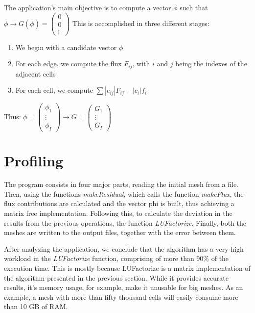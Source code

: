 \documentclass[a4paper,10pt,openright,openbib,twocolumn]{article}
\begin{document}
The application's main objective is to compute a vector $\overline{\phi}$ such that $\overline{\phi} \longrightarrow G(\overline{\phi}) = \left(\begin{array}{c}
0\\ 
0\\
\vdots\end{array}\right)$
This is accomplished in three different stages:
\begin{enumerate}
    \item {We begin with a candidate vector $\phi$} 
    \item {For each edge, we compute the flux $F_{ij}$, with $i$ and $j$ being the indexes of the adjacent cells}
    \item {For each cell, we compute $\sum |e_{ij}| F_{ij} - |c_i| f_i$}
\end{enumerate}
Thus: $\phi = \left(\begin{array}{c}
\phi_1\\
\vdots\\
\phi_I
\end{array}\right) \longrightarrow G = \left(\begin{array}{c}
G_1\\
\vdots\\
G_I
\end{array}\right)$

\section{Profiling}    %
\label{sec:profiling}
The program consists in four major parts, reading the initial mesh from a file. Then, using the functions \emph{makeResidual}, which calls the function \emph{makeFlux}, the flux contributions are calculated and the vector phi is built, thus achieving a matrix free implementation. Following this, to calculate the deviation in the results from the previous operations, the function \emph{LUFactorize}. Finally, both the meshes are written to the output files, together with the error between them.
 
After analyzing the application, we conclude that the algorithm has a very high workload in the \emph{LUFactorize} function, comprising of more than 90\% of the execution time.
This is mostly because LUFactorize is a matrix implementation of the algorithm presented in the previous section. While it provides accurate results, it's memory usage, for example, make it unusable for big meshes. As an example, a mesh with more than fifty thousand cells will easily consume more than 10 GB of RAM. 
\end{document}
